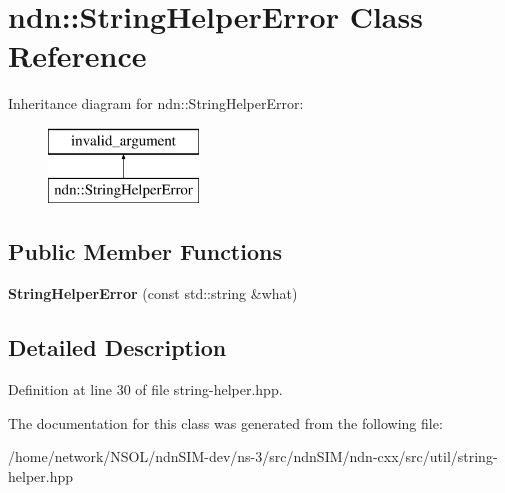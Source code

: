 \hypertarget{classndn_1_1StringHelperError}{}\section{ndn\+:\+:String\+Helper\+Error Class Reference}
\label{classndn_1_1StringHelperError}
Inheritance diagram for ndn\+:\+:String\+Helper\+Error\+:\begin{figure}[H]
\begin{center}
\leavevmode
\includegraphics[height=2.000000cm]{classndn_1_1StringHelperError}
\end{center}
\end{figure}
\subsection*{Public Member Functions}
\begin{DoxyCompactItemize}
\item 
{\bfseries String\+Helper\+Error} (const std\+::string \&what)\hypertarget{classndn_1_1StringHelperError_a3ec915fb916e23936b807eb20a4e0984}{}\label{classndn_1_1StringHelperError_a3ec915fb916e23936b807eb20a4e0984}

\end{DoxyCompactItemize}


\subsection{Detailed Description}


Definition at line 30 of file string-\/helper.\+hpp.



The documentation for this class was generated from the following file\+:\begin{DoxyCompactItemize}
\item 
/home/network/\+N\+S\+O\+L/ndn\+S\+I\+M-\/dev/ns-\/3/src/ndn\+S\+I\+M/ndn-\/cxx/src/util/string-\/helper.\+hpp\end{DoxyCompactItemize}
